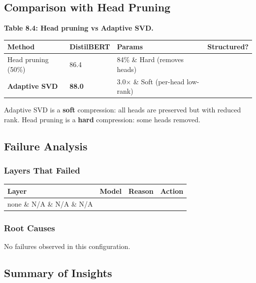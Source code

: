 \subsection{Comparison with Head Pruning}

\textbf{Table 8.4: Head pruning vs Adaptive SVD.}

\begin{table}[H]
\centering
\small
\begin{tabular}{llll}
\toprule
\textbf{Method} & \textbf{DistilBERT} & \textbf{Params} & \textbf{Structured?} \\
\midrule
Head pruning (50\%) & 86.4 & 84\% \& Hard (removes heads) \\
\textbf{Adaptive SVD} & \textbf{88.0} & 3.0$\times$ \& Soft (per-head low-rank) \\
\bottomrule
\end{tabular}
\end{table}

Adaptive SVD is a \textbf{soft} compression: all heads are preserved but with 
reduced rank. Head pruning is a \textbf{hard} compression: some heads removed.

\subsection{Failure Analysis}

\subsubsection{Layers That Failed}

\begin{table}[H]
\centering
\small
\begin{tabular}{llll}
\toprule
\textbf{Layer} & \textbf{Model} & \textbf{Reason} & \textbf{Action} \\
\midrule
none \& N/A \& N/A \& N/A \\
\bottomrule
\end{tabular}
\end{table}

\subsubsection{Root Causes}

No failures observed in this configuration.

\subsection{Summary of Insights}

